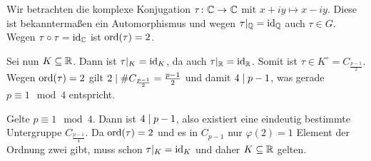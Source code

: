 \begin{exercisePage}
	Wir betrachten die komplexe Konjugation $\abb{\tau}{\C}{\C}$ mit $x+iy \mapsto x - iy$. Diese ist bekanntermaßen ein Automorphismus und wegen $\tau|_{\mathbb{Q}} = \operatorname{id}_{\mathbb{Q}}$ auch $\tau \in G$. Wegen $\tau \circ \tau = \operatorname{id}_{\mathbb{C}}$ ist $\operatorname{ord}(\tau) = 2$.
	
	Sei nun $K \subseteq \mathbb{R}$. Dann ist $\tau |_K = \operatorname{id}_K$, da auch $\tau |_{\mathbb{R}} = \operatorname{id}_{\mathbb{R}}$. Somit ist $\tau \in K^\circ = C_{\frac{p-1}{2}}$. Wegen $\operatorname{ord}(\tau) = 2$ gilt $2 \mathrel{\mid} \# C_{\frac{p-1}{2}} = \frac{p-1}{2}$ und damit $ 4 \mathrel{\mid} p-1$, was gerade $p \equiv 1 \mod 4$ entspricht.
	
	Gelte $p \equiv 1 \mod 4$. Dann ist $4 \mathrel{\mid} p-1$, also existiert eine eindeutig bestimmte Untergruppe $C_{\frac{p-1}{4}}$. Da $\operatorname{ord}(\tau) = 2$ und es in $C_{p-1}$ nur $\varphi(2) = 1$ Element der Ordnung zwei gibt, muss schon $\tau |_K = \operatorname{id}_K$ und daher $K \subseteq \mathbb{R}$ gelten.
\end{exercisePage}